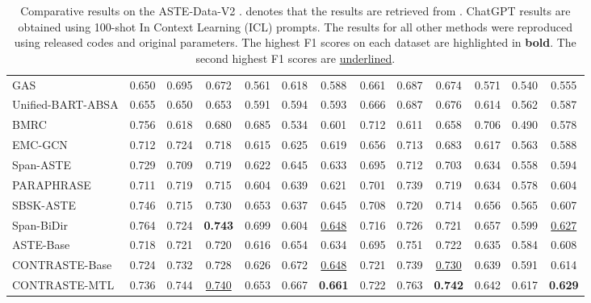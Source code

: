 \begin{table*}
{\begin{tabular}{l|c|c|c|c|c|c|c|c|c|c|c|c}
        GAS  & 0.650 & 0.695 & 0.672 & 0.561 & 0.618 & 0.588 & 0.661 & 0.687 & 0.674 & 0.571 & 0.540 & 0.555 
        \\
        
        Unified-BART-ABSA 
        & 0.655 & 0.650 & 0.653 & 0.591 & 0.594 & 0.593 & 0.666 & 0.687 & 0.676 & 0.614 & 0.562 & 0.587
        \\
        
        BMRC  & 0.756 & 0.618 & 0.680 & 0.685 & 0.534 & 0.601 & 0.712 & 0.611 & 0.658 & 0.706 & 0.490 & 0.578 \\
        
        EMC-GCN  & 0.712 & 0.724 & 0.718 & 0.615 & 0.625 & 0.619 & 0.656 & 0.713 & 0.683 & 0.617 & 0.563 & 0.588 \\
        
        Span-ASTE  & 0.729 & 0.709 & 0.719 & 0.622 & 0.645 & 0.633 & 0.695 & 0.712 & 0.703 & 0.634 & 0.558 & 0.594 \\
        
        PARAPHRASE 
        & 0.711 & 0.719 & 0.715 & 0.604 & 0.639 & 0.621 & 0.701 & 0.739 & 0.719 & 0.634 & 0.578 & 0.604 
        \\

        SBSK-ASTE  &  0.746 & 0.715 & 0.730 & 0.653 & 0.637 & 0.645 & 0.708 & 0.720 & 0.714 & 0.656 & 0.565 & 0.607 \\

        Span-BiDir  &  0.764 & 0.724 & \textbf{0.743} & 0.699 & 0.604 & \underline{0.648} & 0.716 & 0.726 & 0.721 & 0.657 & 0.599 & \underline{0.627} \\
        
        \hline
        
        ASTE-Base & 0.718 & 0.721 & 0.720 & 0.616 & 0.654 & 0.634 & 0.695 & 0.751 & 0.722 & 0.635 & 0.584 & 0.608 \\
        
        CONTRASTE-Base & 0.724 & 0.732 & 0.728 & 0.626 & 0.672 & \underline{0.648} & 0.721 & 0.739 & \underline{0.730} & 0.639 & 0.591 & 0.614 \\
        
        CONTRASTE-MTL
        & 0.736 & 0.744 & \underline{0.740} & 0.653 & 0.667 & \textbf{0.661} & 0.722 & 0.763 & \textbf{0.742} & 0.642 & 0.617 & \textbf{0.629} \\
        
        \hline
        
    \end{tabular}
    }
    \caption{Comparative results on the ASTE-Data-V2 \cite{xu-etal-2020-position}.  denotes that the results are retrieved from \citet{xu-etal-2020-position}.  ChatGPT results are obtained using 100-shot In Context Learning (ICL) prompts. The results for all other methods were reproduced using released codes and original parameters. The highest F1 scores on each dataset are highlighted in \textbf{bold}. The second highest F1 scores are \underline{underlined}.}
    
    \label{tab:main_res}
\end{table*}


